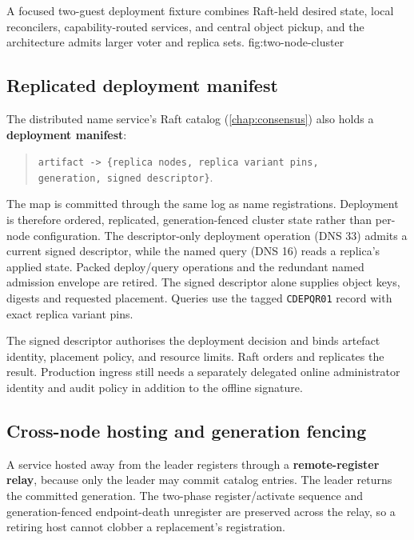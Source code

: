     {A focused two-guest deployment fixture combines Raft-held desired state,
    local reconcilers, capability-routed services, and central object pickup, and
    the architecture admits larger voter and replica sets.}
    {fig:two-node-cluster}

\subsection{Replicated deployment manifest}

The distributed name service's Raft catalog (\autoref{chap:consensus}) also holds a
\textbf{deployment manifest}:

\begin{quote}
\texttt{artifact -> \{replica nodes, replica variant pins,} \\
\texttt{generation, signed descriptor\}}.
\end{quote}

The map is committed through the same log as name registrations. Deployment
is therefore ordered, replicated, generation-fenced cluster state rather than
per-node configuration. The descriptor-only deployment operation (DNS 33) admits a
current signed descriptor, while the named query (DNS 16) reads a replica's applied
state. Packed deploy/query operations and the redundant named admission envelope are retired.
The signed descriptor alone supplies object keys, digests and requested placement.
Queries use the tagged \texttt{CDEPQR01} record with exact replica variant pins.

The signed descriptor authorises the deployment decision and binds artefact
identity, placement policy, and resource limits. Raft orders and replicates the
result. Production ingress still needs a separately delegated online
administrator identity and audit policy in addition to the offline signature.

\subsection{Cross-node hosting and generation fencing}

A service hosted away from the leader registers through a
\textbf{remote-register relay}, because only the leader may commit catalog
entries. The leader returns the committed generation. The two-phase
register/activate sequence and generation-fenced endpoint-death unregister
are preserved across the relay, so a retiring host cannot clobber a
replacement's registration.

